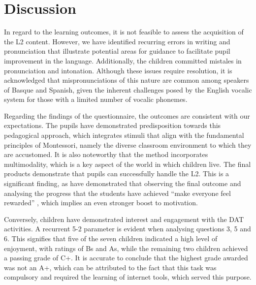 \section{Discussion}\label{sec-discussion}

In regard to the learning outcomes, it is not feasible to assess the
acquisition of the L2 content. However, we have identified recurring
errors in writing and pronunciation that illustrate potential areas for
guidance to facilitate pupil improvement in the language. Additionally,
the children committed mistales in pronunciation and intonation.
Although these issues require resolution, it is acknowledged that
mispronunciations of this nature are common among speakers of Basque and
Spanish, given the inherent challenges posed by the English vocalic
system for those with a limited number of vocalic phonemes.

Regarding the findings of the questionnaire, the outcomes are consistent
with our expectations. The pupils have demonstrated predisposition
towards this pedagogical approach, which integrates stimuli that align
with the fundamental principles of Montessori, namely the diverse
classroom environment to which they are accustomed. It is also
noteworthy that the method incorporates multimodality, which is a key
aspect of the world in which children live. The final products
demonstrate that pupils can successfully handle the L2. This is a
significant finding, as \textcite{alonso-perez2018} have
demonstrated that observing the final outcome and analysing the progress
that the students have achieved ``make everyone feel rewarded'' \cite[p. 21]{alonso-perez2018}, which implies an even stronger boost to motivation.

Conversely, children have demonstrated interest and engagement with the
DAT activities. A recurrent 5-2 parameter is evident when analysing
questions 3, 5 and 6. This signifies that five of the seven children
indicated a high level of enjoyment, with ratings of Bs and As, while
the remaining two children achieved a passing grade of C+. It is
accurate to conclude that the highest grade awarded was not an A+, which
can be attributed to the fact that this task was compulsory and required
the learning of internet tools, which served this purpose.

